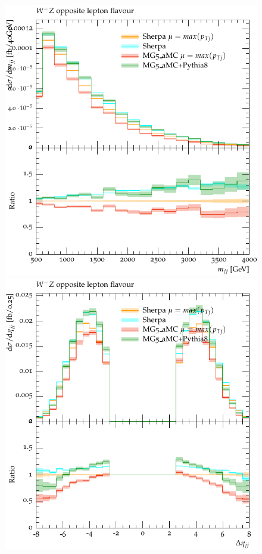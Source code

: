 \begin{figure}[htbp]
\begin{center}
   \includegraphics[scale=0.65]{figs/dyn_WmZ_OF_mjj}
   \includegraphics[scale=0.65]{figs/dyn_WmZ_OF_dEtajj}

\end{center}
\end{figure}
